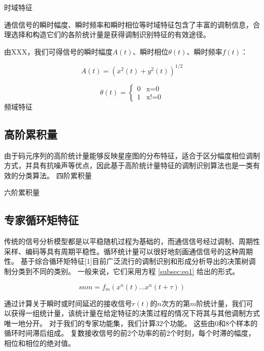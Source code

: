 时域特征\par
通信信号的瞬时幅度、瞬时频率和瞬时相位等时域特征包含了丰富的调制信息，合理选择和构造它们的各阶统计量是获得调制识别特征的有效途径。\par
由XXX，我们可得信号的瞬时幅度$A(t)$、瞬时相位$\theta(t)$、瞬时频率$f(t)$：\par
\begin{equation}
	A(t)=(x^2(t) + y^2(t))^{1/2}
\end{equation}

\begin{equation}
	\theta(t)=
	\begin{cases}
	0& \text{x=0}\\
	1& \text{x!=0}
	\end{cases}
\end{equation}
频域特征\par

\subsection{高阶累积量}
由于码元序列的高阶统计量能够反映星座图的分布特征，适合于区分幅度相位调制方式，并具有抗噪声等优点，因此基于高阶统计量特征的调制识别算法也是一类有效的分类算法。
四阶累积量\par

六阶累积量\par

\subsection{专家循环矩特征}

传统的信号分析模型都是以平稳随机过程为基础的，而通信信号经过调制、周期性采样、编码等具有周期平稳性。循环统计量可以很好地刻画通信信号的这种周期性。
基于综合循环矩特征[1]目前广泛流行的调制识别和形成分析导出的决策树调制分类到不同的类别。 一般来说，它们采用方程 \ref{subsec:eq1} 给出的形式。

\begin{equation}
	\label{subsec:eq1}
	snm = f_{m}(x^{n}(t)...x^{n}(t + \tau))
\end{equation}

通过计算关于瞬时或时间延迟的接收信号$r(t)$的$n$次方的第$m$阶统计量，我们可以获得一组统计量，该统计量在给定特征的决策过程的情况下将其与其他调制方式唯一地分开。 对于我们的专家功能集，我们计算32个功能。 这些由0和8个样本的循环时间滞后组成。 复数接收信号的前2个功率的前2个时刻，每个时滞的幅度，相位和相位的绝对值。\par

